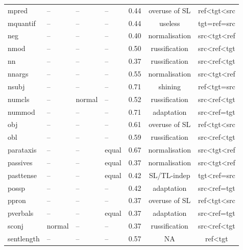 \begin{longtable}{l|p{2cm}p{2cm}p{1.5cm}ccc}
	mpred         & --     & --     & --    & 0.44 & overuse of SL  & ref\textless{}tgt\textless{}src \\
	mquantif      & --     & --     & --    & 0.44 & useless        & tgt=ref=src                     \\
	neg           & --     & --     & --    & 0.40 & normalisation  & src\textless{}tgt\textless{}ref \\
	nmod          & --     & --     & --    & 0.50 & russification  & src\textless{}ref\textless{}tgt \\
	nn            & --     & --     & --    & 0.37 & russification  & src\textless{}ref\textless{}tgt \\
	nnargs        & --     & --     & --    & 0.55 & normalisation  & src\textless{}tgt\textless{}ref \\
	nsubj         & --     & --     & --    & 0.71 & shining        & ref\textless{}tgt=src           \\
	numcls        & --     & normal & --    & 0.52 & russification  & src\textless{}ref\textless{}tgt \\
	nummod        & --     & --     & --    & 0.71 & adaptation     & src\textless{}ref=tgt        \\
	obj           & --     & --     & --    & 0.61 & overuse of SL  & ref\textless{}tgt\textless{}src \\
	obl           & --     & --     & --    & 0.59 & russification  & src\textless{}ref\textless{}tgt \\
	parataxis     & --     & --     & equal & 0.67 & normalisation  & src\textless{}tgt\textless{}ref \\
	passives      & --     & --     & equal & 0.37 & normalisation  & src\textless{}tgt\textless{}ref \\
	pasttense     & --     & --     & equal & 0.42 & SL/TL-indep    & tgt\textless{}ref=src           \\
	possp         & --     & --     & --    & 0.42 & adaptation     & src\textless{}ref=tgt        \\
	ppron         & --     & --     & --    & 0.37 & overuse of SL  & ref\textless{}tgt\textless{}src \\
	pverbals      & --     & --     & equal & 0.37 & adaptation     & src\textless{}ref=tgt        \\  %
	sconj         & normal & --     & --    & 0.37 & russification  & src\textless{}ref\textless{}tgt \\
	sentlength    & --     & --     & --    & 0.57 & NA  & ref\textless{}tgt \\

\end{longtable}
